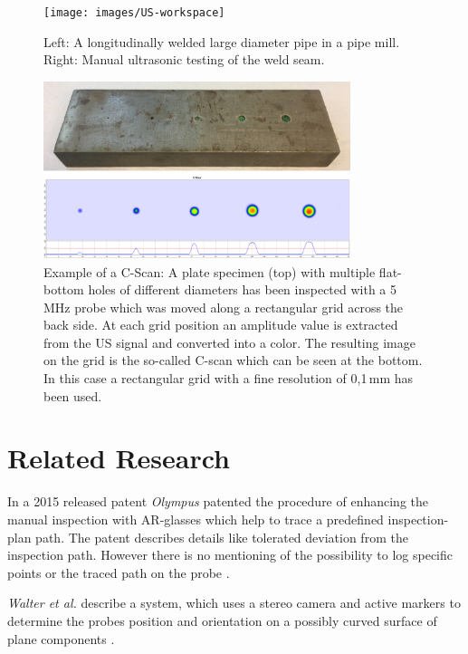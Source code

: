 \documentclass{VRARWorkshop}
\begin{document}
\begin{figure}[h!]
    \begin{center}
        \texttt{[image: images/US-workspace]}
        \caption{\label{fig:manual_UT} Left: A longitudinally welded large diameter pipe in a pipe mill.
				Right: Manual ultrasonic testing of the weld seam.}
    \end{center}
\end{figure}
\begin{figure}[h!]
    \begin{center}
        \includegraphics[width=0.8\textwidth]{images/CScan}
        \caption{\label{fig:cScan} Example of a C-Scan: A plate specimen (top) with multiple flat-bottom holes of different diameters has been inspected with a 5 MHz probe which was moved along a rectangular grid across the back side.
        At each grid position an amplitude value is extracted from the US signal and converted into a color. The resulting image on the grid is the so-called C-scan which can be seen at the bottom.
				In this case a rectangular grid with a fine resolution of 0,1\,mm has been used.}
    \end{center}
\end{figure}

\section{Related Research}
In a 2015 released patent \textit{Olympus} patented the procedure of enhancing the manual inspection with AR-glasses which help to trace a predefined inspection-plan path.
The patent describes details like tolerated deviation from the inspection path.
However there is no mentioning of the possibility to log specific points or the traced path on the probe \cite{ARPat15}.

\textit{Walter et al.} describe a system, which uses a stereo camera and active markers to determine the probes position and orientation on a possibly curved surface of plane components \cite{walter_non-contact_2017}.
\end{document}
